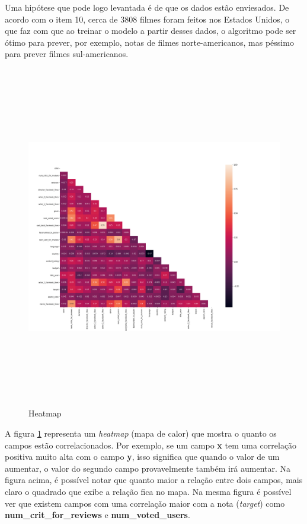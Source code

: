Uma hipótese que pode logo levantada é de que os dados estão enviesados. De acordo com o item 10, cerca de 3808 filmes foram feitos nos Estados Unidos, o que faz com que ao treinar o modelo a partir desses dados, o algoritmo pode ser ótimo para prever, por exemplo, notas de filmes norte-americanos, mas péssimo para prever filmes sul-americanos.

\begin{figure}[H]
\centering
\includegraphics[height=15cm]{imagens/heatmap.png}
\caption{Heatmap}
\label{heatmap}
\end{figure}

A figura \ref{heatmap} representa um \textit{heatmap} (mapa de calor) que mostra o quanto os campos estão correlacionados. Por exemplo, se um campo \textbf{x} tem uma correlação positiva muito alta com o campo \textbf{y}, isso significa que quando o valor de um aumentar, o valor do segundo campo provavelmente também irá aumentar. Na figura acima, é possível notar que quanto maior a relação entre dois campos, mais claro o quadrado que exibe a relação fica no mapa. 
Na mesma figura é possível ver que existem campos com uma correlação maior com a nota (\textit{target}) como \textbf{num\_crit\_for\_reviews} e \textbf{num\_voted\_users}. 


